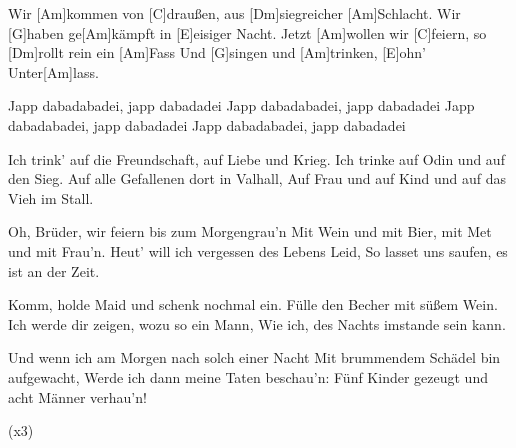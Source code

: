 

\begin{guitar}
	Wir [Am]kommen von [C]draußen, aus [Dm]siegreicher [Am]Schlacht.
	Wir [G]haben ge[Am]kämpft in [E]eisiger Nacht.
	Jetzt [Am]wollen wir [C]feiern, so [Dm]rollt rein ein [Am]Fass
	Und [G]singen und [Am]trinken, [E]ohn' Unter[Am]lass.
	
	Japp dabadabadei, japp dabadadei
	Japp dabadabadei, japp dabadadei
	Japp dabadabadei, japp dabadadei
	Japp dabadabadei, japp dabadadei
	
	Ich trink' auf die Freundschaft, auf Liebe und Krieg.
	Ich trinke auf Odin und auf den Sieg.
	Auf alle Gefallenen dort in Valhall,
	Auf Frau und auf Kind und auf das Vieh im Stall.
	
	 
	
	Oh, Brüder, wir feiern bis zum Morgengrau'n
	Mit Wein und mit Bier, mit Met und mit Frau'n.
	Heut' will ich vergessen des Lebens Leid,
	So lasset uns saufen, es ist an der Zeit.
	
	 
	
	Komm, holde Maid und schenk nochmal ein.
	Fülle den Becher mit süßem Wein.
	Ich werde dir zeigen, wozu so ein Mann,
	Wie ich, des Nachts imstande sein kann.
	
	 
	
	\pagebreak
	
	Und wenn ich am Morgen nach solch einer Nacht
	Mit brummendem Schädel bin aufgewacht,
	Werde ich dann meine Taten beschau'n:
	Fünf Kinder gezeugt und acht Männer verhau'n!
	
	  (x3)
\end{guitar}
